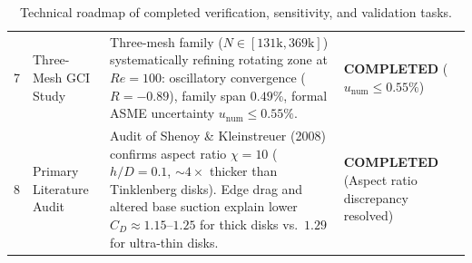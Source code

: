 \documentclass[11pt,a4paper]{article}
\begin{document}
\begin{table}[H]
\begin{tabularx}{\textwidth}{c >{\raggedright\arraybackslash}p{42mm} >{\raggedright\arraybackslash}X >{\centering\arraybackslash}p{32mm}}
7 & Three-Mesh GCI Study & Three-mesh family ($N \in [131\text{k}, 369\text{k}]$) systematically refining rotating zone at $Re = 100$: oscillatory convergence ($R = -0.89$), family span $0.49\%$, formal ASME uncertainty $u_{\mathrm{num}} \le 0.55\%$. & \textbf{COMPLETED} \newline ($u_{\mathrm{num}} \le 0.55\%$) \\
8 & Primary Literature Audit & Audit of Shenoy \& Kleinstreuer (2008) confirms aspect ratio $\chi = 10$ ($h/D = 0.1$, $\sim 4\times$ thicker than Tinklenberg disks). Edge drag and altered base suction explain lower $C_D \approx 1.15\text{--}1.25$ for thick disks vs.\ $1.29$ for ultra-thin disks. & \textbf{COMPLETED} \newline (Aspect ratio discrepancy resolved) \\
\bottomrule
\end{tabularx}
\caption{Technical roadmap of completed verification, sensitivity, and validation tasks.}
\label{tab:roadmap}
\end{table}
\end{document}
